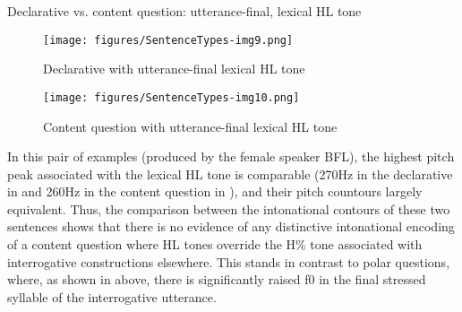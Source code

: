 
\ea\label{ex:14:declarative vs. content question with HL tone}
{Declarative vs. content question: utterance-final, lexical HL tone}

 \label{ex:14:declarative vs. content question with HL tonea}
        \label{ex:14:declarative vs. content question with HL toneb}
    \z
\z

\begin{figure}
\texttt{[image: figures/SentenceTypes-img9.png]}
\caption{
\label{fig: declarative with HL tone}
Declarative with utterance-final lexical HL tone}
\end{figure}

\begin{figure}
\texttt{[image: figures/SentenceTypes-img10.png]}
\caption{
\label{fig: content question with lexical HL tone}
Content question with utterance-final lexical HL tone}
\end{figure}

In this pair of examples (produced by the female speaker BFL), the highest pitch peak associated with the lexical HL tone is comparable (270Hz in the declarative in  and 260Hz in the content question in ), and their pitch countours largely equivalent. Thus, the comparison between the intonational contours of these two sentences shows that there is no evidence of any distinctive intonational encoding of a content question where HL tones override the H\% tone associated with interrogative constructions elsewhere. This stands in contrast to polar questions, where, as shown in  above, there is significantly raised f0 in the final stressed syllable of the interrogative utterance.

